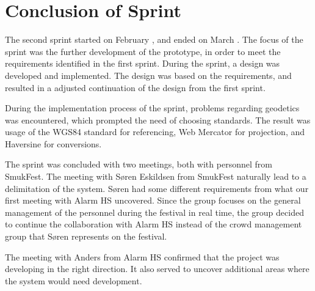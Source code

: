 \section{Conclusion of Sprint}
The second sprint started on February , and ended on March . The focus of the sprint was the further development of the prototype, in order to meet the requirements identified in the first sprint. During the sprint, a design was developed and implemented. The design was based on the requirements, and resulted in a adjusted continuation of the design from the first sprint.

During the implementation process of the sprint, problems regarding geodetics was encountered, which prompted the need of choosing standards. The result was usage of the WGS84 standard for referencing, Web Mercator for projection, and Haversine for conversions.

The sprint was concluded with two meetings, both with personnel from SmukFest. The meeting with Søren Eskildsen from SmukFest naturally lead to a delimitation of the system. Søren had some different requirements from what our first meeting with Alarm HS uncovered. Since the group focuses on the general management of the personnel during the festival in real time, the group decided to continue the collaboration with Alarm HS instead of the crowd management group that Søren represents on the festival.

The meeting with Anders from Alarm HS confirmed that the project was developing in the right direction. It also served to uncover additional areas where the system would need development.